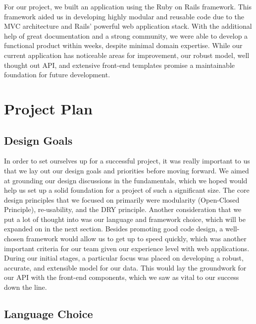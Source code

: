 \documentclass[11pt]{article}
\begin{document}
For our project, we built an application using the Ruby on Rails framework. This framework aided us in developing highly modular and reusable code due to the MVC architecture and Rails' powerful web application stack. With the additional help of great documentation and a strong community, we were able to develop a functional product within weeks, despite minimal domain expertise. While our current application has noticeable areas for improvement, our robust model, well thought out API, and extensive front-end templates promise a maintainable foundation for future development. 

\section{Project Plan}

\subsection{Design Goals}

In order to set ourselves up for a successful project, it was really important to us that we lay out our design goals and priorities before moving forward. We aimed at grounding our design discussions in the fundamentals, which we hoped would help us set up a solid foundation for a project of such a significant size. The core design principles that we focused on primarily were modularity (Open-Closed Principle), re-usability, and the DRY principle. Another consideration that we put a lot of thought into was our language and framework choice, which will be expanded on in the next section. Besides promoting good code design, a well-chosen framework would allow us to get up to speed quickly, which was another important criteria for our team given our experience level with web applications. During our initial stages, a particular focus was placed on developing a robust, accurate, and extensible model for our data. This would lay the groundwork for our API with the front-end components, which we saw as vital to our success down the line. 


\subsection{Language Choice}



\end{document}
